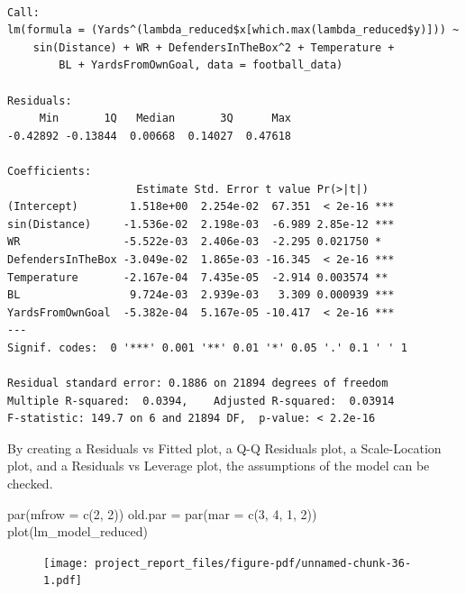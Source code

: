 \documentclass[
  super,
  preprint,
  3p]{elsarticle}
\newenvironment{Shaded}{\begin{snugshade}}{\end{snugshade}}
\newcommand{\AttributeTok}[1]{\textcolor[rgb]{0.40,0.45,0.13}{#1}}
\newcommand{\DecValTok}[1]{\textcolor[rgb]{0.68,0.00,0.00}{#1}}
\newcommand{\FunctionTok}[1]{\textcolor[rgb]{0.28,0.35,0.67}{#1}}
\newcommand{\NormalTok}[1]{\textcolor[rgb]{0.00,0.23,0.31}{#1}}
\newcommand{\OtherTok}[1]{\textcolor[rgb]{0.00,0.23,0.31}{#1}}
\begin{document}
\begin{verbatim}

Call:
lm(formula = (Yards^(lambda_reduced$x[which.max(lambda_reduced$y)])) ~ 
    sin(Distance) + WR + DefendersInTheBox^2 + Temperature + 
        BL + YardsFromOwnGoal, data = football_data)

Residuals:
     Min       1Q   Median       3Q      Max 
-0.42892 -0.13844  0.00668  0.14027  0.47618 

Coefficients:
                    Estimate Std. Error t value Pr(>|t|)    
(Intercept)        1.518e+00  2.254e-02  67.351  < 2e-16 ***
sin(Distance)     -1.536e-02  2.198e-03  -6.989 2.85e-12 ***
WR                -5.522e-03  2.406e-03  -2.295 0.021750 *  
DefendersInTheBox -3.049e-02  1.865e-03 -16.345  < 2e-16 ***
Temperature       -2.167e-04  7.435e-05  -2.914 0.003574 ** 
BL                 9.724e-03  2.939e-03   3.309 0.000939 ***
YardsFromOwnGoal  -5.382e-04  5.167e-05 -10.417  < 2e-16 ***
---
Signif. codes:  0 '***' 0.001 '**' 0.01 '*' 0.05 '.' 0.1 ' ' 1

Residual standard error: 0.1886 on 21894 degrees of freedom
Multiple R-squared:  0.0394,    Adjusted R-squared:  0.03914 
F-statistic: 149.7 on 6 and 21894 DF,  p-value: < 2.2e-16
\end{verbatim}

By creating a Residuals vs Fitted plot, a Q-Q Residuals plot, a
Scale-Location plot, and a Residuals vs Leverage plot, the assumptions
of the model can be checked.

\begin{Shaded}
\begin{Highlighting}[]
\FunctionTok{par}\NormalTok{(}\AttributeTok{mfrow =} \FunctionTok{c}\NormalTok{(}\DecValTok{2}\NormalTok{, }\DecValTok{2}\NormalTok{))}
\NormalTok{old.par }\OtherTok{=} \FunctionTok{par}\NormalTok{(}\AttributeTok{mar =} \FunctionTok{c}\NormalTok{(}\DecValTok{3}\NormalTok{, }\DecValTok{4}\NormalTok{, }\DecValTok{1}\NormalTok{, }\DecValTok{2}\NormalTok{))}
\FunctionTok{plot}\NormalTok{(lm\_model\_reduced)}
\end{Highlighting}
\end{Shaded}

\begin{figure}[H]

{\centering \texttt{[image: project\_report\_files/figure-pdf/unnamed-chunk-36-1.pdf]}

}

\end{figure}
\end{document}
